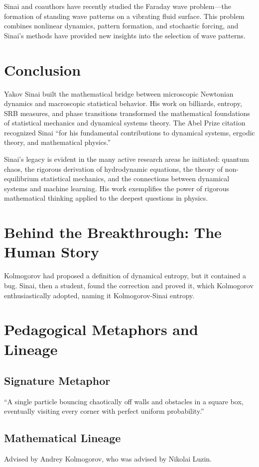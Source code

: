Sinai and coauthors have recently studied the Faraday wave problem---the formation of standing wave patterns on a vibrating fluid surface. This problem combines nonlinear dynamics, pattern formation, and stochastic forcing, and Sinai's methods have provided new insights into the selection of wave patterns.

\section{Conclusion}

Yakov Sinai built the mathematical bridge between microscopic Newtonian dynamics and macroscopic statistical behavior. His work on billiards, entropy, SRB measures, and phase transitions transformed the mathematical foundations of statistical mechanics and dynamical systems theory. The Abel Prize citation recognized Sinai ``for his fundamental contributions to dynamical systems, ergodic theory, and mathematical physics.''

Sinai's legacy is evident in the many active research areas he initiated: quantum chaos, the rigorous derivation of hydrodynamic equations, the theory of non-equilibrium statistical mechanics, and the connections between dynamical systems and machine learning. His work exemplifies the power of rigorous mathematical thinking applied to the deepest questions in physics.


\section{Behind the Breakthrough: The Human Story}
Kolmogorov had proposed a definition of dynamical entropy, but it contained a bug. Sinai, then a student, found the correction and proved it, which Kolmogorov enthusiastically adopted, naming it Kolmogorov-Sinai entropy.

\section{Pedagogical Metaphors and Lineage}
\subsection{Signature Metaphor}
``A single particle bouncing chaotically off walls and obstacles in a square box, eventually visiting every corner with perfect uniform probability.''

\subsection{Mathematical Lineage}
Advised by Andrey Kolmogorov, who was advised by Nikolai Luzin.

